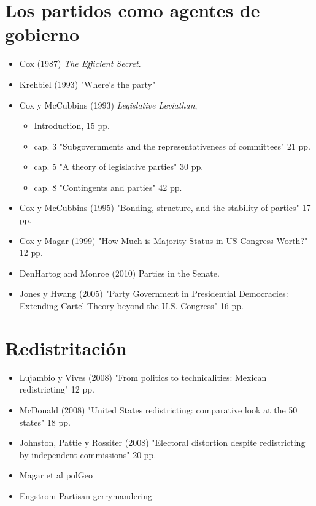 \documentclass{article}
\begin{document}
\section{Los partidos como agentes de gobierno}
\label{sec:orga17210b}
\begin{itemize}
\item Cox (1987) \emph{The Efficient Secret}.
\item Krehbiel (1993) "Where's the party"
\item Cox y McCubbins (1993) \emph{Legislative Leviathan}, 
\begin{itemize}
\item Introduction, 15 pp.
\item cap. 3 "Subgovernments and the representativeness of committees" 21 pp.
\item cap. 5 "A theory of legislative parties" 30 pp.
\item cap. 8 "Contingents and parties" 42 pp.
\end{itemize}
\item Cox y McCubbins (1995) "Bonding, structure, and the stability of parties" 17 pp.
\item Cox y Magar (1999) "How Much is Majority Status in US Congress Worth?" 12 pp.
\item DenHartog and Monroe (2010) Parties in the Senate.
\item Jones y Hwang (2005) "Party Government in Presidential Democracies: Extending Cartel Theory beyond the U.S. Congress" 16 pp.
\end{itemize}

\section{Redistritación}
\label{sec:org85b067c}
\begin{itemize}
\item Lujambio y Vives (2008) "From politics to technicalities: Mexican redistricting" 12 pp.
\item McDonald (2008) "United States redistricting: comparative look at the 50 states" 18 pp.
\item Johnston, Pattie y Rossiter (2008) "Electoral distortion despite redistricting by independent commissions" 20 pp.
\item Magar et al polGeo
\item Engstrom Partisan gerrymandering
\end{itemize}
\end{document}
